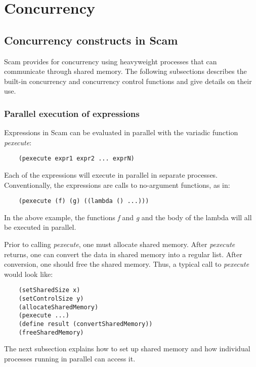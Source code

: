 \chapter{Concurrency}
\label{Concurrency}

\section{Concurrency constructs in Scam}

Scam provides for concurrency using heavyweight processes that
can communicate through shared memory. The following subsections
describes the built-in concurrency and concurrency control
functions and give details on
their use.

\subsection{Parallel execution of expressions}

Expressions in Scam can be evaluated in parallel with the variadic function
{\it pexecute}:

\begin{verbatim}
    (pexecute expr1 expr2 ... exprN)
\end{verbatim}

Each of the expressions will execute in parallel in separate processes.
Conventionally, the expressions are calls to no-argument functions, as in:

\begin{verbatim}
    (pexecute (f) (g) ((lambda () ...)))
\end{verbatim}

In the above example, the functions {\it f} and {\it g}
and the body of the lambda
will all be executed in parallel.

Prior to calling {\it pexecute}, one must allocate shared memory.
After {\it pexecute} returns, one can convert the data in shared memory into
a regular list. After conversion, one should free the shared memory.
Thus, a typical call to {\it pexecute} would look like:

\begin{verbatim}
    (setSharedSize x)
    (setControlSize y)
    (allocateSharedMemory)
    (pexecute ...)
    (define result (convertSharedMemory))
    (freeSharedMemory)
\end{verbatim}
    
The next subsection explains how to set up shared
memory and how individual processes running in parallel can access
it.

